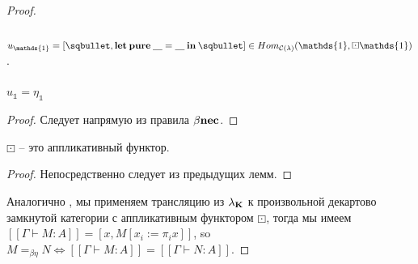 \begin{proof}
\begin{defin}
  $ $

  $u_{\mathds{1}} = [\sqbullet, {\bf let \: pure \:} \underline{\quad} = \underline{\quad} {\: \bf in \:} \sqbullet] \in Hom_{\mathcal{C}(\lambda)}(\mathds{1}, \boxdot \mathds{1})$.
\end{defin}

\begin{lemma}
  $ $

  $u_{\mathds{1}} = \eta_{\mathds{1}}$

\end{lemma}

\begin{proof}

  Следует напрямую из правила $\beta {\bf nec}$.
\end{proof}

\begin{lemma}

  $\boxdot$ -- это аппликативный функтор.
\end{lemma}

\begin{proof}
  Непосредственно следует из предыдущих лемм.
\end{proof}

Аналогично \cite{Abramsky}, мы применяем трансляцию из $\lambda_{{\bf K}}$ к произвольной декартово замкнутой категории с аппликативным функтором $\boxdot$, тогда
мы имеем $[\![\Gamma \vdash M : A]\!] = [x, M [x_i := \pi_i x]]$, so $M =_{\beta \eta} N \Leftrightarrow [\![\Gamma \vdash M : A]\!] = [\![\Gamma \vdash N : A]\!]$.

\end{proof}
